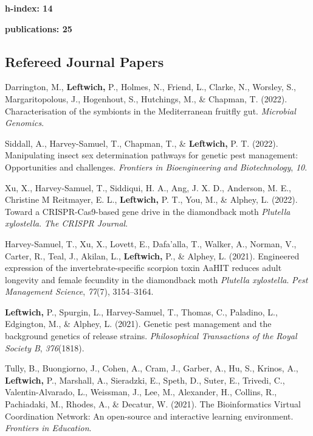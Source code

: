 \documentclass[11pt, a4paper]{awesome-cv}
\begin{document}
\textbf{h-index: 14}

\textbf{publications: 25} \endgroup

\hypertarget{refereed-journal-papers}{%
\subsection{Refereed Journal Papers}\label{refereed-journal-papers}}

\begingroup
\setlength{\parindent}{0.2in}

\hypertarget{refs_journals}{}
\leavevmode\hypertarget{ref-22}{}%
Darrington, M., \textbf{Leftwich,} P., Holmes, N., Friend, L., Clarke,
N., Worsley, S., Margaritopolous, J., Hogenhout, S., Hutchings, M., \&
Chapman, T. (2022). Characterisation of the symbionts in the
{Mediterranean} fruitfly gut. \emph{Microbial Genomics}.

\leavevmode\hypertarget{ref-23}{}%
Siddall, A., Harvey-Samuel, T., Chapman, T., \& \textbf{Leftwich,} P. T.
(2022). Manipulating insect sex determination pathways for genetic pest
management: Opportunities and challenges. \emph{Frontiers in
Bioengineering and Biotechnology}, \emph{10}.

\leavevmode\hypertarget{ref-21}{}%
Xu, X., Harvey-Samuel, T., Siddiqui, H. A., Ang, J. X. D., Anderson, M.
E., Christine M Reitmayer, E. L., \textbf{Leftwich,} P. T., You, M., \&
Alphey, L. (2022). Toward a CRISPR-Cas9-based gene drive in the
diamondback moth \emph{{Plutella} xylostella}. \emph{The CRISPR
Journal}.

\leavevmode\hypertarget{ref-19}{}%
Harvey-Samuel, T., Xu, X., Lovett, E., Dafa'alla, T., Walker, A.,
Norman, V., Carter, R., Teal, J., Akilan, L., \textbf{Leftwich,} P., \&
Alphey, L. (2021). Engineered expression of the invertebrate-specific
scorpion toxin {AaHIT} reduces adult longevity and female fecundity in
the diamondback moth \emph{{Plutella} xylostella}. \emph{Pest Management
Science}, \emph{77}(7), 3154--3164.

\leavevmode\hypertarget{ref-13}{}%
\textbf{Leftwich,} P., Spurgin, L., Harvey-Samuel, T., Thomas, C.,
Paladino, L., Edgington, M., \& Alphey, L. (2021). Genetic pest
management and the background genetics of release strains.
\emph{Philosophical Transactions of the Royal Society B},
\emph{376}(1818).

\leavevmode\hypertarget{ref-20}{}%
Tully, B., Buongiorno, J., Cohen, A., Cram, J., Garber, A., Hu, S.,
Krinos, A., \textbf{Leftwich,} P., Marshall, A., Sieradzki, E., Speth,
D., Suter, E., Trivedi, C., Valentin-Alvarado, L., Weissman, J., Lee,
M., Alexander, H., Collins, R., Pachiadaki, M., Rhodes, A., \& Decatur,
W. (2021). The {Bioinformatics} {Virtual} {Coordination} {Network}: An
open-source and interactive learning environment. \emph{Frontiers in
Education}.
\end{document}
